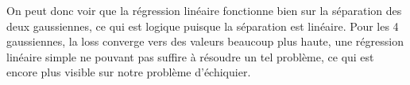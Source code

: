 \documentclass{article}
\begin{document}
On peut donc voir que la régression linéaire fonctionne bien sur la séparation des deux gaussiennes, ce qui est logique puisque la séparation est linéaire. Pour les 4 gaussiennes, la loss converge vers des valeurs beaucoup plus haute, une régression linéaire simple ne pouvant pas suffire à résoudre un tel problème, ce qui est encore plus visible sur notre problème d'échiquier.
\end{document}
